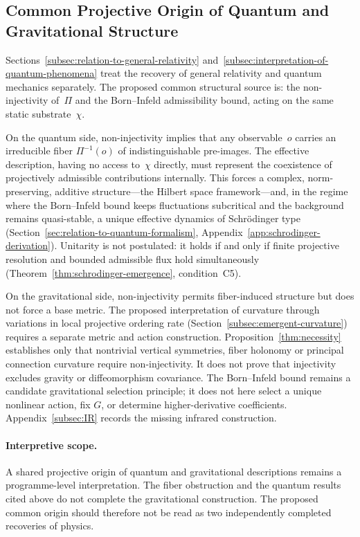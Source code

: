 \subsection{Common Projective Origin of Quantum and Gravitational Structure}
  \label{subsec:common-projective-origin}

  Sections~\ref{subsec:relation-to-general-relativity}
  and~\ref{subsec:interpretation-of-quantum-phenomena} treat the recovery of
  general relativity and quantum mechanics separately.
  The proposed common structural source is:
  the non-injectivity of~$\Pi$ and the Born--Infeld admissibility bound,
  acting on the same static substrate~$\chi$.

  On the quantum side, non-injectivity implies that any observable~$o$ carries
  an irreducible fiber $\Pi^{-1}(o)$ of indistinguishable pre-images.
  The effective description, having no access to~$\chi$ directly, must represent
  the coexistence of projectively admissible contributions internally.
  This forces a complex, norm-preserving, additive structure---the Hilbert space
  framework---and, in the regime where the Born--Infeld bound keeps fluctuations
  subcritical and the background remains quasi-stable, a unique effective dynamics
  of Schr\"odinger type (Section~\ref{sec:relation-to-quantum-formalism},
  Appendix~\ref{app:schrodinger-derivation}).
  Unitarity is not postulated: it holds if and only if finite projective resolution
  and bounded admissible flux hold simultaneously
  (Theorem~\ref{thm:schrodinger-emergence}, condition~C5).

  On the gravitational side, non-injectivity permits fiber-induced structure but does not force a base metric.
  The proposed interpretation of curvature through variations in local projective ordering rate
  (Section~\ref{subsec:emergent-curvature}) requires a separate metric and action construction.
  Proposition~\ref{thm:necessity} establishes only that nontrivial vertical symmetries, fiber holonomy or
  principal connection curvature require non-injectivity.
  It does not prove that injectivity excludes gravity or diffeomorphism covariance.
  The Born--Infeld bound remains a candidate gravitational selection principle; it does not here select
  a unique nonlinear action, fix $G$, or determine higher-derivative coefficients.
  Appendix~\ref{subsec:IR} records the missing infrared construction.

  \paragraph{Interpretive scope.}
  A shared projective origin of quantum and gravitational descriptions remains a programme-level interpretation.
  The fiber obstruction and the quantum results cited above do not complete the gravitational construction.
  The proposed common origin should therefore not be read as two independently completed recoveries of physics.
